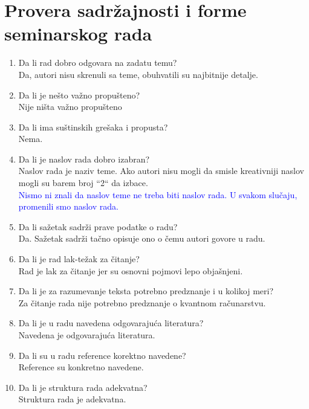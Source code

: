\documentclass[a4paper]{report}
\newcommand{\odgovor}[1]{\textcolor{blue}{#1}}
\begin{document}
\section{Provera sadržajnosti i forme seminarskog rada}

\begin{enumerate}
\item Da li rad dobro odgovara na zadatu temu?\\
Da, autori nisu skrenuli sa teme, obuhvatili su najbitnije detalje.

\item Da li je nešto važno propušteno?\\
Nije ništa važno propušteno

\item Da li ima suštinskih grešaka i propusta?\\
Nema. 

\item Da li je naslov rada dobro izabran?\\
Naslov rada je naziv teme. Ako autori nisu mogli da smisle kreativniji naslov mogli su barem broj ``2`` da izbace. \\
\odgovor {Nismo ni znali da naslov teme ne treba biti naslov rada. U svakom slučaju, promenili smo naslov rada.}

\item Da li sažetak sadrži prave podatke o radu?\\
Da. Sažetak sadrži tačno opisuje ono o čemu autori govore u radu.

\item Da li je rad lak-težak za čitanje?\\
Rad je lak za čitanje jer su osnovni pojmovi lepo objašnjeni.

\item Da li je za razumevanje teksta potrebno predznanje i u kolikoj meri?\\
Za čitanje rada nije potrebno predznanje o kvantnom računarstvu. 

\item Da li je u radu navedena odgovarajuća literatura?\\
Navedena je odgovarajuća literatura.

\item Da li su u radu reference korektno navedene?\\
Reference su konkretno navedene.

\item Da li je struktura rada adekvatna?\\
Struktura rada je adekvatna.


\end{enumerate}
\end{document}
